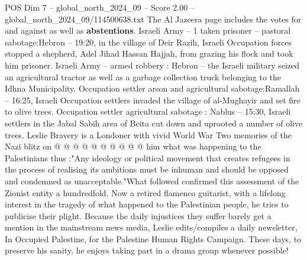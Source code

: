 \begin{textsample}{POS Dim 7 – global\_north\_2024\_09 – Score 2.00 – global\_north\_2024\_09/114500638.txt}
The Al Jazeera page includes the votes for and against as well as \textbf{abstentions}.
Israeli Army -- 1 taken prisoner -- pastoral sabotage:Hebron -- 19:20, in the village of Deir Razih, Israeli Occupation forces stopped a shepherd, Adel Jihad Hassan Hajjah, from grazing his flock and took him prisoner.
Israeli Army -- armed robbery : Hebron -- the Israeli military seized an agricultural tractor as well as a garbage collection truck belonging to the Idhna Municipality.
Occupation settler arson and agricultural sabotage:Ramallah -- 16:25, Israeli Occupation settlers invaded the village of al-Mughayir and set fire to olive trees.
Occupation settler agricultural sabotage : Nablus -- 15:30, Israeli settlers in the Jabal Sabih area of Beita cut down and uprooted a number of olive trees.
Leslie Bravery is a Londoner with vivid World War Two memories of the Nazi blitz on @ @ @ @ @ @ @ @ @ @ him what was happening to the Palestinians thus :"Any ideology or political movement that creates refugees in the process of realising its ambitions must be inhuman and should be opposed and condemned as unacceptable."What followed confirmed this assessment of the Zionist entity a hundredfold.
Now a retired flamenco guitarist, with a lifelong interest in the tragedy of what happened to the Palestinian people, he tries to publicise their plight.
Because the daily injustices they suffer barely get a mention in the mainstream news media, Leslie edits/compiles a daily newsletter, In Occupied Palestine, for the Palestine Human Rights Campaign.
These days, to preserve his sanity, he enjoys taking part in a drama group whenever possible!

\end{textsample}
